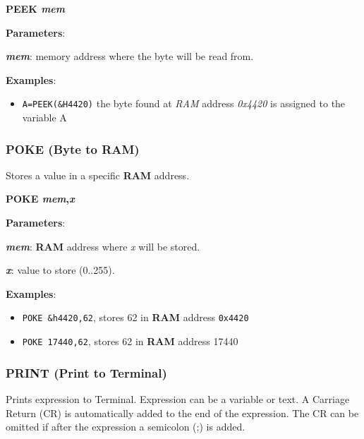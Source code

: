     \hspace{1.9cm}\textbf{PEEK \textit{mem}}

    \textbf{Parameters}:

    \hspace{1cm}\textbf{\textit{mem}}: memory address where the byte will be
    read from.

    \textbf{Examples}:
    \begin{itemize}
        \item \texttt{A=PEEK(\&H4420)} the byte found at \textit{RAM} address
        \textit{0x4420} is assigned to the variable A
    \end{itemize}

    \subsubsection{{POKE (Byte to RAM)}}
    \label{msbasic:lang:poke}
    Stores a value in a specific \textbf{RAM} address.

    \hspace{1.9cm}\textbf{POKE \textit{mem},\textit{x}}

    \textbf{Parameters}:

    \hspace{1cm}\textbf{\textit{mem}}: \textbf{RAM} address where \textit{x}
    will be stored.

    \hspace{1cm}\textbf{\textit{x}}: value to store (0..255).

    \textbf{Examples}:
    \begin{itemize}
        \item \texttt{POKE \&h4420,62}, stores 62 in \textbf{RAM} address
        \texttt{0x4420}
        \item \texttt{POKE 17440,62}, stores 62 in \textbf{RAM} address 17440
    \end{itemize}

    \subsubsection{{PRINT (Print to Terminal)}}
    \label{msbasic:lang:print}
    Prints expression to Terminal. Expression can be a variable or text. A
    Carriage Return (CR) is automatically added to the end of the expression.
    The CR can be omitted if after the expression a semicolon (;) is added.

